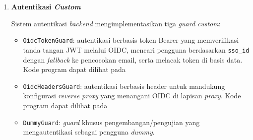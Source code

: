 \begin{enumerate}[listparindent=1cm]
\begin{enumerate}[listparindent=1cm, label=\alph*.]
                        Lapisan layanan (\textit{service}) dan repositori (\textit{repository}) diimplementasikan dengan pola \textit{interface-implementation}. \textit{Interface} didefinisikan untuk setiap layanan dan repositori sebagai "kontrak" atau panduan, kemudian \textit{implementation} konkrit diregister sebagai \textit{singleton} di \texttt{AppServiceProvider}. Layanan dan repositori utama meliputi:

                        \begin{itemize}
                              \item \texttt{OidcService}/\texttt{OidcServiceImpl}: menangani verifikasi token JWT OIDC, introspeksi token, dan pengambilan informasi pengguna dari \textit{identity provider}. Kode program dapat dilihat pada 
                              \item \texttt{SsoService}/\texttt{SsoServiceImpl}: menangani operasi CRUD terhadap API Authentik SSO untuk sinkronisasi pengguna dan otorisasi. Kode program dapat dilihat pada 
                              \item \texttt{StorageRepository}/\texttt{StorageRepositoryImpl}: abstraksi penyimpanan berkas dengan pelacakan manifest JSON. Berkas lama dihapus secara asinkron melalui \textit{job} \texttt{DeleteBlob}. Kode program dapat dilihat pada 
                        \end{itemize}

                  \item \textbf{Autentikasi \textit{Custom}}

                        Sistem autentikasi \textit{backend} mengimplementasikan tiga \textit{guard} \textit{custom}:

                        \begin{itemize}
                              \item \texttt{OidcTokenGuard}: autentikasi berbasis token Bearer yang memverifikasi tanda tangan JWT melalui OIDC, mencari pengguna berdasarkan \texttt{sso\_id} dengan \textit{fallback} ke pencocokan email, serta melacak token di basis data. Kode program dapat dilihat pada 
                              \item \texttt{OidcHeadersGuard}: autentikasi berbasis header untuk mandukung konfigurasi \textit{reverse proxy} yang menangani OIDC di lapisan \textit{proxy}. Kode program dapat dilihat pada 
                              \item \texttt{DummyGuard}: \textit{guard} khusus pengembangan/pengujian yang mengautentikasi sebagai pengguna \textit{dummy}.
                        \end{itemize}


\end{enumerate}
\end{enumerate}
